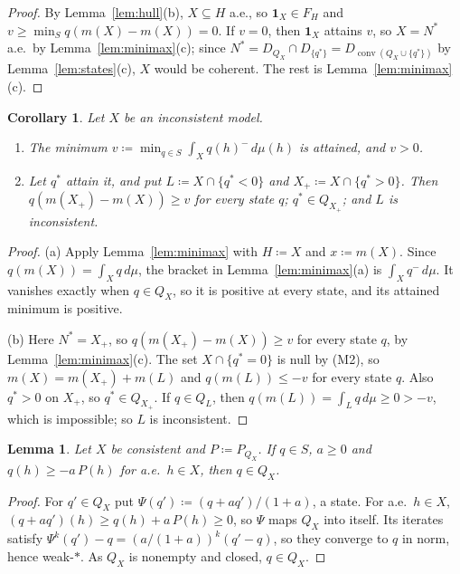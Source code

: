 \documentclass[11pt]{article}
\newcommand{\one}{\mathbf{1}}
\DeclareMathOperator{\conv}{conv}
\theoremstyle{plain}
\newtheorem{lemma}[theorem]{Lemma}
\newtheorem{corollary}[theorem]{Corollary}
\theoremstyle{definition}
\theoremstyle{remark}
\begin{document}
\begin{proof}
By Lemma~\ref{lem:hull}(b), $X\subseteq H$ a.e., so $\one_X\in F_H$ and $v\ge\min_Sq(m(X)-
m(X))=0$. If $v=0$, then $\one_X$ attains $v$, so $X=N^\ast$ a.e.\ by
Lemma~\ref{lem:minimax}(c); since $N^\ast=D_{Q_X}\cap D_{\{q^\ast\}}=D_{\conv(Q_X\cup\{q^\ast\})}$
by Lemma~\ref{lem:states}(c), $X$ would be coherent. The rest is Lemma~\ref{lem:minimax}(c).
\end{proof}

\begin{corollary}\label{cor:losing}
Let $X$ be an inconsistent model.
\begin{enumerate}[label=(\alph*)]
  \item The minimum $v\coloneqq\min_{q\in S}\int_Xq(h)^-\,d\mu(h)$ is attained, and $v>0$.
  \item Let $q^\ast$ attain it, and put $L\coloneqq X\cap\{q^\ast<0\}$ and $X_+\coloneqq
  X\cap\{q^\ast>0\}$. Then $q(m(X_+)-m(X))\ge v$ for every state $q$; $q^\ast\in Q_{X_+}$; and
  $L$ is inconsistent.
\end{enumerate}
\end{corollary}

\begin{proof}
(a) Apply Lemma~\ref{lem:minimax} with $H\coloneqq X$ and $x\coloneqq m(X)$. Since $q(m(X))=
\int_Xq\,d\mu$, the bracket in Lemma~\ref{lem:minimax}(a) is $\int_Xq^-\,d\mu$. It vanishes
exactly when $q\in Q_X$, so it is positive at every state, and its attained minimum is
positive.

(b) Here $N^\ast=X_+$, so $q(m(X_+)-m(X))\ge v$ for every state $q$, by
Lemma~\ref{lem:minimax}(c). The set $X\cap\{q^\ast=0\}$ is null by (M2), so $m(X)=m(X_+)+m(L)$
and $q(m(L))\le-v$ for every state $q$. Also $q^\ast>0$ on $X_+$, so $q^\ast\in Q_{X_+}$. If
$q\in Q_L$, then $q(m(L))=\int_Lq\,d\mu\ge0>-v$, which is impossible; so $L$ is inconsistent.
\end{proof}

\begin{lemma}\label{lem:contraction}
Let $X$ be consistent and $P\coloneqq P_{Q_X}$. If $q\in S$, $a\ge0$ and $q(h)\ge-a\,P(h)$
for a.e.\ $h\in X$, then $q\in Q_X$.
\end{lemma}

\begin{proof}
For $q'\in Q_X$ put $\Psi(q')\coloneqq(q+aq')/(1+a)$, a state. For a.e.\ $h\in X$, $(q+aq')(h)
\ge q(h)+a\,P(h)\ge0$, so $\Psi$ maps $Q_X$ into itself. Its iterates satisfy $\Psi^k(q')-q=
(a/(1+a))^k(q'-q)$, so they converge to $q$ in norm, hence weak-$\ast$. As $Q_X$ is nonempty
and closed, $q\in Q_X$.
\end{proof}
\end{document}
